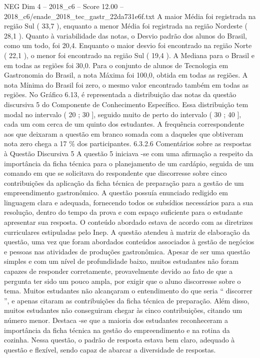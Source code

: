 \begin{textsample}{NEG Dim 4 – 2018\_c6 – Score 12.00 – 2018\_c6/enade\_2018\_tec\_gastr\_22da731e6f.txt}
A maior Média foi registrada na região Sul ( 33,7 ), enquanto a menor Média foi registrada na região Nordeste ( 28,1 ).
Quanto à variabilidade das notas, o Desvio padrão dos alunos do Brasil, como um todo, foi 20,4.
Enquanto o maior desvio foi encontrado na região Norte ( 22,1 ), o menor foi encontrado na região Sul ( 19,4 ).
A Mediana para o Brasil e em todas as regiões foi 30,0.
Para o conjunto de alunos de Tecnologia em Gastronomia do Brasil, a nota Máxima foi 100,0, obtida em todas as regiões.
A nota Mínima do Brasil foi zero, o mesmo valor encontrado também em todas as regiões.
No Gráfico 6.13, é representada a distribuição das notas da questão discursiva 5 do Componente de Conhecimento Específico.
Essa distribuição tem modal no intervalo ( 20 ; 30 ], seguido muito de perto do intervalo ( 30 ; 40 ], cada um com cerca de um quinto dos estudantes.
A frequência correspondente aos que deixaram a questão em branco somada com a daqueles que obtiveram nota zero chega a 17 \% dos participantes. 6.3.2.6 Comentários sobre as respostas à Questão Discursiva 5 A questão 5 iniciava -se com uma afirmação a respeito da importância da ficha técnica para o planejamento de um cardápio, seguida de um comando em que se solicitava do respondente que discorresse sobre cinco contribuições da aplicação da ficha técnica de preparação para a gestão de um empreendimento gastronômico.
A questão possuía enunciado redigido em linguagem clara e adequada, fornecendo todos os subsídios necessários para a sua resolução, dentro do tempo da prova e com espaço suficiente para o estudante apresentar sua resposta.
O conteúdo abordado estava de acordo com as diretrizes curriculares estipuladas pelo Inep.
A questão atendeu à matriz de elaboração da questão, uma vez que foram abordados conteúdos associados à gestão de negócios e pessoas nas atividades de produções gastronômica.
Apesar de ser uma questão simples e com um nível de profundidade baixo, muitos estudantes não foram capazes de responder corretamente, provavelmente devido ao fato de que a pergunta ter sido um pouco ampla, por exigir que o aluno discorresse sobre o tema.
Muitos estudantes não alcançaram o entendimento do que seria “ discorrer ”, e apenas citaram as contribuições da ficha técnica de preparação.
Além disso, muitos estudantes não conseguiram chegar às cinco contribuições, citando um número menor.
Destaca -se que a maioria dos estudantes reconheceram a importância da ficha técnica na gestão do empreendimento e na rotina da cozinha.
Nessa questão, o padrão de resposta estava bem claro, adequado à questão e flexível, sendo capaz de abarcar a diversidade de respostas.

\end{textsample}

